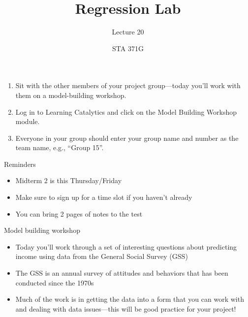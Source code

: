 \documentclass{beamer}\usepackage[]{graphicx}\usepackage[]{color}
\title{Regression Lab}
\subtitle{Lecture 20}
\author{STA 371G}
\begin{document}
  
  

  \frame{\maketitle}



  \begin{darkframes}
    \begin{frame}
      \begin{enumerate}
        \item Sit with the other members of your project group---today you'll work with them on a model-building workshop.
        \item Log in to Learning Catalytics and click on the Model Building Workshop module.
        \item Everyone in your group should enter your group name and number as the team name, e.g., ``Group 15''.
      \end{enumerate}
    \end{frame}

    \begin{frame}{Reminders}
      \begin{itemize}
        \item Midterm 2 is this Thursday/Friday
        \item Make sure to sign up for a time slot if you haven't already
        \item You can bring 2 pages of notes to the test
      \end{itemize}
    \end{frame}

    \begin{frame}{Model building workshop}
      \begin{itemize}
        \item Today you'll work through a set of interesting questions about predicting income using data from the General Social Survey (GSS)
        \item The GSS is an annual survey of attitudes and behaviors that has been conducted since the 1970s
        \item Much of the work is in getting the data into a form that you can work with and dealing with data issues---this will be good practice for your project!
      \end{itemize}
    \end{frame}


\end{darkframes}
\end{document}
